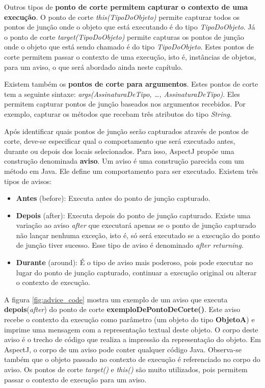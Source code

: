 Outros tipos de \textbf{ponto de corte permitem capturar o contexto de uma
execução}. O ponto de corte \textit{this(TipoDoObjeto)} permite capturar todos
os pontos de junção onde o objeto que está executando é do tipo
\textit{TipoDoObjeto}. Já o ponto de corte \textit{target(TipoDoObjeto)} permite
capturas os pontos de junção onde o objeto que está sendo chamado é do tipo
\textit{TipoDoObjeto}. Estes pontos de corte permitem passar o contexto de uma execução, isto é, instâncias de objetos, para um aviso,
o que será abordado ainda neste capítulo. 

Existem também os \textbf{pontos de corte para argumentos}.
Estes pontos de corte tem a seguinte sintaxe: \textit{args(AssinaturaDeTipo, 
\ldots , AssinaturaDeTipo)}. Eles permitem capturar pontos de junção
baseados nos argumentos recebidos. Por exemplo, capturar os métodos 
que recebam três atributos do tipo \textit{String}.

Após identificar quais pontos de junção serão capturados através de pontos de
corte, deve-se especificar qual o comportamento que será executado antes, 
durante ou depois dos locais selecionados. Para isso, AspectJ propõe uma
construção denominada \textbf{aviso}. Um aviso é uma construção parecida com um método
em Java. Ele define um comportamento para ser executado. Existem três tipos de
avisos:

\begin{itemize}
  \item \textbf{Antes} (before): Executa antes do ponto de junção capturado.
  \item \textbf{Depois} (after): Executa depois do ponto de junção capturado.
  Existe uma variação ao aviso \textit{after} que executará apenas se o ponto de
  junção capturado não lançar nenhuma exceção, isto é, só será executado se a execução
  do ponto de junção tiver sucesso. Esse tipo de aviso é denominado
  \textit{after returning}.
  \item \textbf{Durante} (around): É o tipo de aviso mais poderoso, pois
  pode executar no lugar do ponto de junção capturado, continuar a execução
  original ou alterar o contexto de execução.
\end{itemize}

A figura \ref{fig:advice_code} mostra um exemplo de um aviso que executa
\textbf{depois}(\textit{after}) do ponto de corte
\textbf{exemploDePontoDeCorte()}. Este aviso recebe o contexto da execução
como parâmetro (um objeto do tipo \textbf{ObjetoA}) e imprime uma
mensagem com a representação textual deste objeto. O corpo deste aviso é o
trecho de código que realiza a impressão da representação do objeto. Em AspectJ,
o corpo de um aviso pode conter qualquer código Java. Observa-se também que o
objeto passado no contexto de execução é referenciado no corpo do aviso. Os
pontos de corte \textit{target()} e \textit{this()} são muito utilizados, pois
permitem passar o contexto de execução para um aviso.

